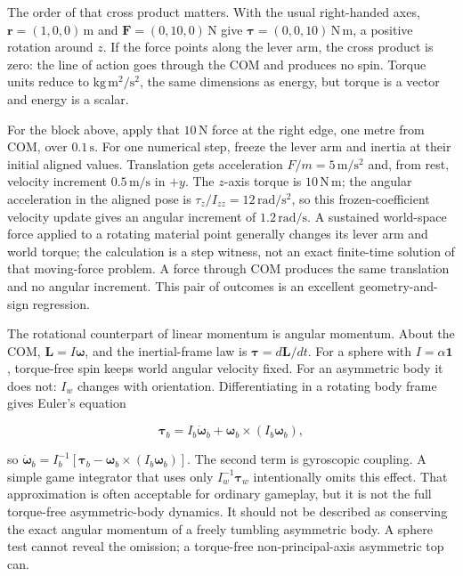 The order of that cross product matters. With the usual right-handed axes, \(\mathbf r=(1,0,0)\,\mathrm m\) and \(\mathbf F=(0,10,0)\,\mathrm N\) give \(\boldsymbol\tau=(0,0,10)\,\mathrm{N\,m}\), a positive rotation around \(z\). If the force points along the lever arm, the cross product is zero: the line of action goes through the COM and produces no spin. Torque units reduce to \(\mathrm{kg\,m^2/s^2}\), the same dimensions as energy, but torque is a vector and energy is a scalar.

For the block above, apply that \(10\,\mathrm N\) force at the right edge, one metre from COM, over \(0.1\,\mathrm s\). For one numerical step, freeze the lever arm and inertia at their initial aligned values. Translation gets acceleration \(F/m=5\,\mathrm{m/s^2}\) and, from rest, velocity increment \(0.5\,\mathrm{m/s}\) in \(+y\). The \(z\)-axis torque is \(10\,\mathrm{N\,m}\); the angular acceleration in the aligned pose is \(\tau_z/I_{zz}=12\,\mathrm{rad/s^2}\), so this frozen-coefficient velocity update gives an angular increment of \(1.2\,\mathrm{rad/s}\). A sustained world-space force applied to a rotating material point generally changes its lever arm and world torque; the calculation is a step witness, not an exact finite-time solution of that moving-force problem. A force through COM produces the same translation and no angular increment. This pair of outcomes is an excellent geometry-and-sign regression.

The rotational counterpart of linear momentum is angular momentum. About the COM, \(\mathbf L=I\boldsymbol\omega\), and the inertial-frame law is \(\boldsymbol\tau=d\mathbf L/dt\). For a sphere with \(I=\alpha\mathbf1\), torque-free spin keeps world angular velocity fixed. For an asymmetric body it does not: \(I_w\) changes with orientation. Differentiating in a rotating body frame gives Euler's equation

\[
\boldsymbol\tau_b=I_b\dot{\boldsymbol\omega}_b+\boldsymbol\omega_b\times(I_b\boldsymbol\omega_b),
\]

so \(\dot{\boldsymbol\omega}_b=I_b^{-1}[\boldsymbol\tau_b-\boldsymbol\omega_b\times(I_b\boldsymbol\omega_b)]\). The second term is gyroscopic coupling. A simple game integrator that uses only \(I_w^{-1}\boldsymbol\tau_w\) intentionally omits this effect. That approximation is often acceptable for ordinary gameplay, but it is not the full torque-free asymmetric-body dynamics. It should not be described as conserving the exact angular momentum of a freely tumbling asymmetric body. A sphere test cannot reveal the omission; a torque-free non-principal-axis asymmetric top can.

